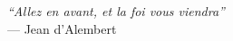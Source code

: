 \cleardoublepage
{}
\thispagestyle{empty}
\vspace*{3pt}
\vfill
\begin{center}{
    \slshape
    ``Allez en avant, et la foi vous viendra''} \\
    \medskip
    --- Jean d'Alembert
\end{center}
\vfill


